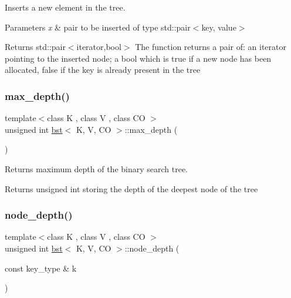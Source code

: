 Inserts a new element in the tree. 


\begin{DoxyParams}{Parameters}
{\em x} & pair to be inserted of type std\+::pair$<$key, value$>$ \\
\hline
\end{DoxyParams}
\begin{DoxyReturn}{Returns}
std\+::pair$<$iterator,bool$>$ The function returns a pair of\+: an iterator pointing to the inserted node; a bool which is true if a new node has been allocated, false if the key is already present in the tree 
\end{DoxyReturn}
\mbox{\label{classbst_a8fbf73218beab695fbb039323df137cb}} 
\subsubsection{\texorpdfstring{max\+\_\+depth()}{max\_depth()}}
{\footnotesize\ttfamily template$<$class K , class V , class CO $>$ \\
unsigned int \hyperlink{classbst}{bst}$<$ K, V, CO $>$\+::max\+\_\+depth (\begin{DoxyParamCaption}{ }\end{DoxyParamCaption})}



Returns maximum depth of the binary search tree. 

\begin{DoxyReturn}{Returns}
unsigned int storing the depth of the deepest node of the tree 
\end{DoxyReturn}
\mbox{\label{classbst_ad51cfdf4a6b9fdba73d605e5c56f0dc9}} 
\subsubsection{\texorpdfstring{node\+\_\+depth()}{node\_depth()}}
{\footnotesize\ttfamily template$<$class K , class V , class CO $>$ \\
unsigned int \hyperlink{classbst}{bst}$<$ K, V, CO $>$\+::node\+\_\+depth (\begin{DoxyParamCaption}\item[{const key\+\_\+type \&}]{k }\end{DoxyParamCaption})}



